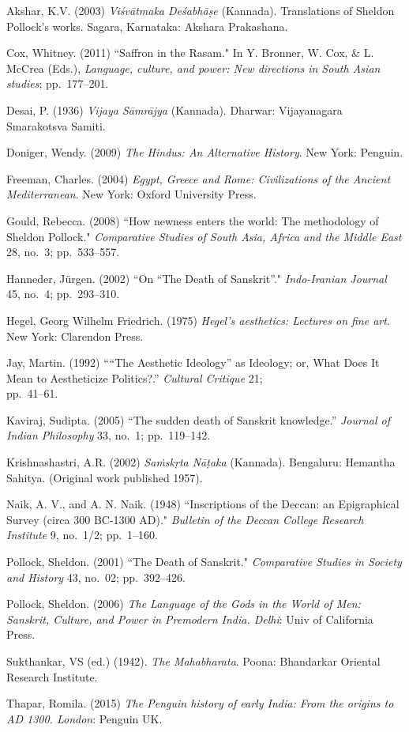 \begin{thebibliography}{99}
\itemsep=2pt
Akshar, K.V. (2003) {\sl Viśvātmaka Deśabhāṣe} (Kannada). Translations of Sheldon Pollock’s works. Sagara, Karnataka: Akshara Prakashana.

Cox, Whitney. (2011) ``Saffron in the Rasam." In Y. Bronner, W. Cox, \& L. McCrea (Eds.), {\sl Language, culture, and power: New directions in South Asian studies}; pp.~177--201.

Desai, P. (1936) {\sl Vijaya Sāmrājya} (Kannada). Dharwar: Vijayanagara Smarakotsva Samiti.

Doniger, Wendy. (2009) {\sl The Hindus: An Alternative History}. New York: Penguin.

Freeman, Charles. (2004) {\sl Egypt, Greece and Rome: Civilizations of the Ancient Mediterranean}. New York: Oxford University Press.

Gould, Rebecca. (2008) ``How newness enters the world: The methodology of Sheldon Pollock." {\sl Comparative Studies of South Asia, Africa and the Middle East} 28, no.~3; pp.~533--557.

Hanneder, Jürgen. (2002) ``On “The Death of Sanskrit”." {\sl Indo-Iranian Journal} 45, no.~4; pp.~293--310.

Hegel, Georg Wilhelm Friedrich. (1975) {\sl Hegel's aesthetics: Lectures on fine art}. New York: Clarendon Press.

Jay, Martin. (1992) ““The Aesthetic Ideology” as Ideology; or, What Does It Mean to Aestheticize Politics?.” {\sl Cultural Critique} 21;\\ pp.~41--61.

Kaviraj, Sudipta. (2005) “The sudden death of Sanskrit knowledge.” {\sl Journal of Indian Philosophy} 33, no.~1; pp.~119--142.

Krishnashastri, A.R. (2002) {\sl Saṁskṛta Nāṭaka} (Kannada). Bengaluru: Hemantha Sahitya. (Original work published 1957).

Naik, A. V., and A. N. Naik. (1948) “Inscriptions of the Deccan: an Epigraphical Survey (circa 300 BC-1300 AD)." {\sl Bulletin of the Deccan College Research Institute} 9, no.~1/2; pp.~1--160.

Pollock, Sheldon. (2001) ``The Death of Sanskrit." {\sl Comparative Studies in Society and History} 43, no.~02; pp.~392--426.

Pollock, Sheldon. (2006) {\sl The Language of the Gods in the World of Men: Sanskrit, Culture, and Power in Premodern India. Delhi}: Univ of California Press.

Sukthankar, VS  (ed.) (1942). {\sl The Mahabharata}. Poona: Bhandarkar Oriental Research Institute.

Thapar, Romila. (2015) {\sl The Penguin history of early India: From the origins to AD 1300. London}: Penguin UK.

\end{thebibliography}
